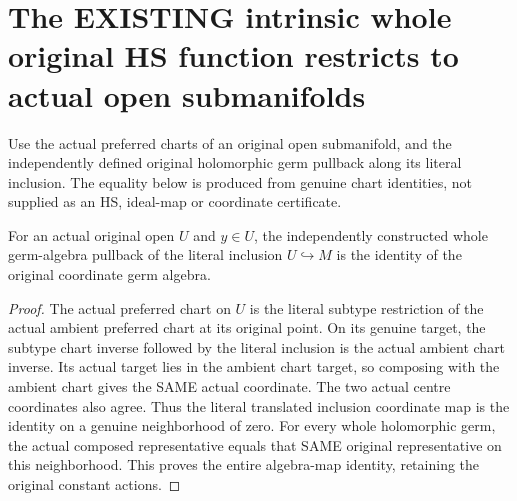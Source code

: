 \section{The EXISTING intrinsic whole original HS function restricts to actual open submanifolds}

Use the actual preferred charts of an original open submanifold, and the
independently defined original holomorphic germ pullback along its literal
inclusion. The equality below is produced from genuine chart identities,
not supplied as an HS, ideal-map or coordinate certificate.

\begin{lemma}
\label{hir:actual-open-inclusion-whole-germ-pullback-identity}
\leanok
For an actual original open $U$ and $y\in U$, the independently constructed
whole germ-algebra pullback of the literal inclusion $U\hookrightarrow M$
is the identity of the original coordinate germ algebra.
\end{lemma}
\begin{proof}
The actual preferred chart on $U$ is the literal subtype restriction of
the actual ambient preferred chart at its original point. On its genuine
target, the subtype chart inverse followed by the literal inclusion is
the actual ambient chart inverse. Its actual target lies in the ambient
chart target, so composing with the ambient chart gives the SAME actual
coordinate. The two actual centre coordinates also agree. Thus the literal
translated inclusion coordinate map is the identity on a genuine neighborhood
of zero. For every whole holomorphic germ, the actual composed representative
equals that SAME original representative on this neighborhood. This proves
the entire algebra-map identity, retaining the original constant actions.
\end{proof}

